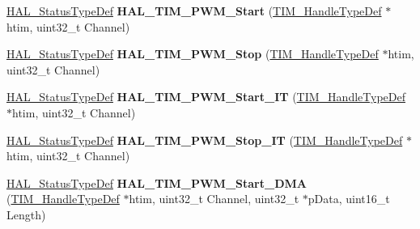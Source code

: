\begin{DoxyCompactItemize}
\item 
\hypertarget{group___t_i_m___exported___functions___group3_ga11da9bda53a5d21c293bb01da91e592d}{\hyperlink{stm32l1xx__hal__def_8h_a63c0679d1cb8b8c684fbb0632743478f}{H\-A\-L\-\_\-\-Status\-Type\-Def} {\bfseries H\-A\-L\-\_\-\-T\-I\-M\-\_\-\-P\-W\-M\-\_\-\-Start} (\hyperlink{struct_t_i_m___handle_type_def}{T\-I\-M\-\_\-\-Handle\-Type\-Def} $\ast$htim, uint32\-\_\-t Channel)}\label{group___t_i_m___exported___functions___group3_ga11da9bda53a5d21c293bb01da91e592d}

\item 
\hypertarget{group___t_i_m___exported___functions___group3_gae087011858379feeb770ecb4568829d3}{\hyperlink{stm32l1xx__hal__def_8h_a63c0679d1cb8b8c684fbb0632743478f}{H\-A\-L\-\_\-\-Status\-Type\-Def} {\bfseries H\-A\-L\-\_\-\-T\-I\-M\-\_\-\-P\-W\-M\-\_\-\-Stop} (\hyperlink{struct_t_i_m___handle_type_def}{T\-I\-M\-\_\-\-Handle\-Type\-Def} $\ast$htim, uint32\-\_\-t Channel)}\label{group___t_i_m___exported___functions___group3_gae087011858379feeb770ecb4568829d3}

\item 
\hypertarget{group___t_i_m___exported___functions___group3_gaca1f5fbc35101d0fc7e8af31c9a0c26c}{\hyperlink{stm32l1xx__hal__def_8h_a63c0679d1cb8b8c684fbb0632743478f}{H\-A\-L\-\_\-\-Status\-Type\-Def} {\bfseries H\-A\-L\-\_\-\-T\-I\-M\-\_\-\-P\-W\-M\-\_\-\-Start\-\_\-\-I\-T} (\hyperlink{struct_t_i_m___handle_type_def}{T\-I\-M\-\_\-\-Handle\-Type\-Def} $\ast$htim, uint32\-\_\-t Channel)}\label{group___t_i_m___exported___functions___group3_gaca1f5fbc35101d0fc7e8af31c9a0c26c}

\item 
\hypertarget{group___t_i_m___exported___functions___group3_ga0559af125dc5fb2bb183a6a4b86808b5}{\hyperlink{stm32l1xx__hal__def_8h_a63c0679d1cb8b8c684fbb0632743478f}{H\-A\-L\-\_\-\-Status\-Type\-Def} {\bfseries H\-A\-L\-\_\-\-T\-I\-M\-\_\-\-P\-W\-M\-\_\-\-Stop\-\_\-\-I\-T} (\hyperlink{struct_t_i_m___handle_type_def}{T\-I\-M\-\_\-\-Handle\-Type\-Def} $\ast$htim, uint32\-\_\-t Channel)}\label{group___t_i_m___exported___functions___group3_ga0559af125dc5fb2bb183a6a4b86808b5}

\item 
\hypertarget{group___t_i_m___exported___functions___group3_gaa4b542b3c0ae347ea580c9e7c8e88b17}{\hyperlink{stm32l1xx__hal__def_8h_a63c0679d1cb8b8c684fbb0632743478f}{H\-A\-L\-\_\-\-Status\-Type\-Def} {\bfseries H\-A\-L\-\_\-\-T\-I\-M\-\_\-\-P\-W\-M\-\_\-\-Start\-\_\-\-D\-M\-A} (\hyperlink{struct_t_i_m___handle_type_def}{T\-I\-M\-\_\-\-Handle\-Type\-Def} $\ast$htim, uint32\-\_\-t Channel, uint32\-\_\-t $\ast$p\-Data, uint16\-\_\-t Length)}\label{group___t_i_m___exported___functions___group3_gaa4b542b3c0ae347ea580c9e7c8e88b17}


\end{DoxyCompactItemize}
